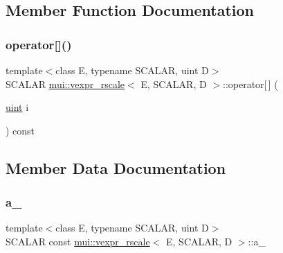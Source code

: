 \subsection{Member Function Documentation}
\mbox{\label{structmui_1_1vexpr__rscale_a93714b51cff9d8fb745881a4cc9eb9d3}} 
\subsubsection{\texorpdfstring{operator[]()}{operator[]()}}
{\footnotesize\ttfamily template$<$class E, typename S\+C\+A\+L\+AR, uint D$>$ \\
S\+C\+A\+L\+AR \hyperlink{structmui_1_1vexpr__rscale}{mui\+::vexpr\+\_\+rscale}$<$ E, S\+C\+A\+L\+AR, D $>$\+::operator\mbox{[}$\,$\mbox{]} (\begin{DoxyParamCaption}\item[{\hyperlink{namespacemui_af15a3e7188a2117fb9965277bb0cacd2}{uint}}]{i }\end{DoxyParamCaption}) const\hspace{0.3cm}{\ttfamily [inline]}}



\subsection{Member Data Documentation}
\mbox{\label{structmui_1_1vexpr__rscale_a095b01b590708a6b8f87ac4e89965ff5}} 
\subsubsection{\texorpdfstring{a\+\_\+}{a\_}}
{\footnotesize\ttfamily template$<$class E, typename S\+C\+A\+L\+AR, uint D$>$ \\
S\+C\+A\+L\+AR const \hyperlink{structmui_1_1vexpr__rscale}{mui\+::vexpr\+\_\+rscale}$<$ E, S\+C\+A\+L\+AR, D $>$\+::a\+\_\+\hspace{0.3cm}{\ttfamily [protected]}}

\mbox{\label{structmui_1_1vexpr__rscale_ac4e8567acb997b3fc2fb5a1a7a6fda96}} 
